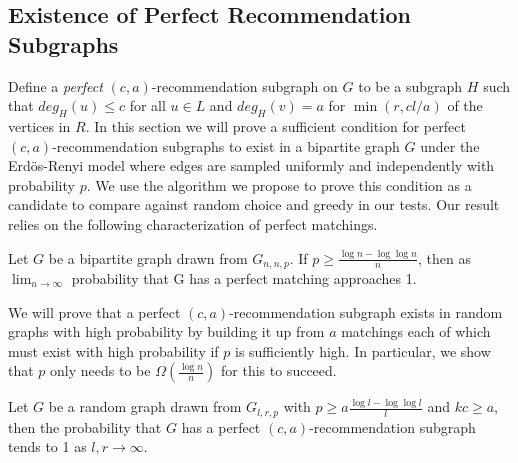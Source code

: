 \subsection{Existence of Perfect Recommendation Subgraphs}
Define a \emph{perfect} $(c,a)$-recommendation subgraph on $G$ to be a subgraph $H$ such that
$deg_H(u)\leq c$ for all $u\in L$ and $deg_H(v)=a$ for
$\min(r,cl/a)$ of the vertices in $R$. In this section we will
prove a sufficient condition for perfect $(c,a)$-recommendation
subgraphs to exist in a bipartite graph $G$ under the Erd\"os-Renyi model\cite{ErdosRenyi59} where edges are sampled
uniformly and independently with probability $p$.
We use the algorithm we propose to prove this condition as a candidate to compare against random choice and greedy in our tests.
Our result relies on
the following characterization of perfect matchings.

\begin{thm}\cite{Janson2011}
\label{random_matching_threshold}
Let $G$ be a bipartite graph drawn from $G_{n, n, p}$. If $p \geq \frac{\log n -
\log\log n}{n}$, then as $\lim_{n\to\infty}$ probability that G has a perfect
    matching approaches 1.
\end{thm}

We will prove that a perfect $(c,a)$-recommendation subgraph exists in
random graphs with high probability by building it up from $a$
matchings each of which must exist with high probability if $p$ is
sufficiently high. In particular, we show that $p$ only needs to
be $\Omega(\frac{\log n}{n})$ for this to succeed.

\begin{thm}
Let $G$ be a random graph drawn from $G_{l, r, p}$ with $p\geq a\frac{\log l-\log\log
l}{l}$ and $kc \geq a$, then the probability that $G$ has a perfect $(c, a)$-recommendation
subgraph tends to 1 as $l,r\to\infty$.
\end{thm}

